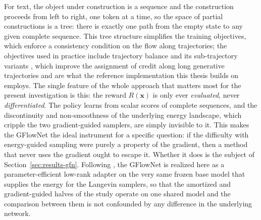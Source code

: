 For text, the object under construction is a sequence and the construction proceeds from left to right, one token at a time, so the space of partial constructions is a tree: there is exactly one path from the empty state to any given complete sequence. This tree structure simplifies the training objectives, which enforce a consistency condition on the flow along trajectories; the objectives used in practice include trajectory balance \citep{malkin2022trajectory} and its sub-trajectory variants \citep{madan2023learning}, which improve the assignment of credit along long generative trajectories and are what the reference implementation this thesis builds on employs. The single feature of the whole approach that matters most for the present investigation is this: the reward $R(\bm{x})$ is only ever \emph{evaluated}, never \emph{differentiated}. The policy learns from scalar scores of complete sequences, and the discontinuity and non-smoothness of the underlying energy landscape, which cripple the two gradient-guided samplers, are simply invisible to it. This makes the GFlowNet the ideal instrument for a specific question: if the difficulty with energy-guided sampling were purely a property of the gradient, then a method that never uses the gradient ought to escape it. Whether it does is the subject of Section~\ref{sec:results-gfn}. Following \citet{hu2024amortizing}, the GFlowNet is realized here as a parameter-efficient low-rank adapter \citep{hu2022lora} on the very same frozen base model that supplies the energy for the Langevin samplers, so that the amortized and gradient-guided halves of the study operate on one shared model and the comparison between them is not confounded by any difference in the underlying network.

